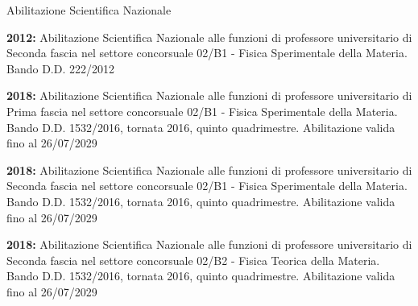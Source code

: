 \begin{statementblock}{Abilitazione Scientifica Nazionale}
\end{statementblock}
\begin{enumerate}[label={[P\arabic*]}]
\item \textbf{2012: } Abilitazione Scientifica Nazionale alle funzioni di professore universitario di
  Seconda fascia nel settore concorsuale 02/B1 - Fisica Sperimentale
  della Materia. Bando D.D. 222/2012

\item \textbf{2018:} Abilitazione Scientifica Nazionale alle funzioni di professore universitario di
  Prima fascia nel settore concorsuale 02/B1 - Fisica Sperimentale
  della Materia. Bando D.D. 1532/2016, tornata 2016, quinto
  quadrimestre. Abilitazione valida fino al 26/07/2029

\item \textbf{2018:} Abilitazione Scientifica Nazionale alle funzioni di professore universitario di
  Seconda fascia nel settore concorsuale 02/B1 - Fisica Sperimentale
  della Materia. Bando D.D. 1532/2016, tornata 2016, quinto
  quadrimestre. Abilitazione valida fino al 26/07/2029

\item \textbf{2018: } Abilitazione Scientifica Nazionale alle funzioni di professore universitario di
  Seconda fascia nel settore concorsuale 02/B2 - Fisica Teorica
  della Materia. Bando D.D. 1532/2016, tornata 2016, quinto
  quadrimestre. Abilitazione valida fino al 26/07/2029

\end{enumerate}
